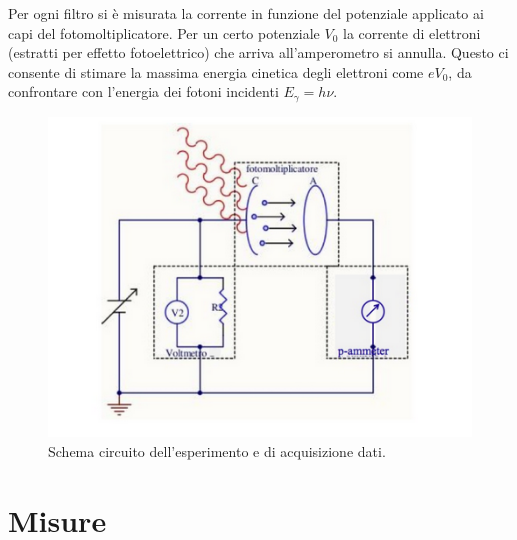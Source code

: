 \documentclass[10pt,a4paper]{article}
\begin{document}
Per ogni filtro si è misurata la corrente in funzione del potenziale applicato ai capi del fotomoltiplicatore. Per un certo potenziale $V_0$ la corrente di elettroni (estratti per effetto fotoelettrico) che arriva all'amperometro si annulla. Questo ci consente di stimare la massima energia cinetica degli elettroni come $eV_0$, da confrontare con l'energia dei fotoni incidenti $E_{\gamma}=h\nu$.
\begin{figure}[!htb]
  \centering
  \includegraphics[scale=.5]{circuito.png}
\caption{Schema circuito dell'esperimento e di acquisizione dati.\label{circuito}}
\end{figure}


\section{Misure}
\end{document}

